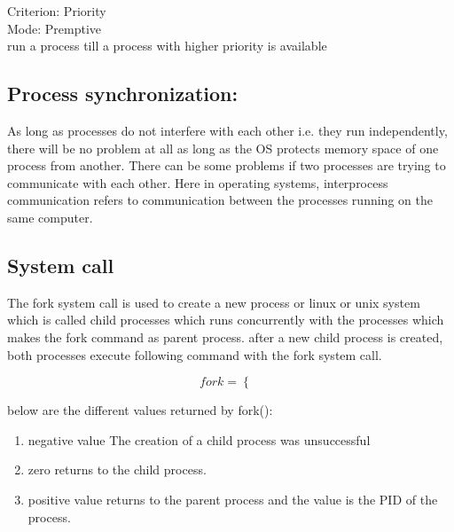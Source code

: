 \documentclass[12pt,letterpaper]{article}
\begin{document}
  Criterion: Priority\\ 
  Mode: Premptive\\ 
  
  run a process till a process with higher priority is available

  \subsection{Process synchronization:}
  As long as processes do not interfere with each other i.e. they run independently, 
  there will be no problem at all as long as the OS protects memory space of one process
  from another. There can be some problems if two processes are trying to communicate 
  with each other. Here in operating systems, interprocess communication refers to 
  communication between the processes running on the same computer. 


  \subsection{System call}
  The fork system call is used to create a new process or linux or unix system which is 
  called child processes which runs concurrently with the processes which makes the 
  fork command as parent process. after a new child process is created, both processes 
  execute following command with the fork system call. 

  \[
    fork = \begin{cases} \end{cases}
  \]

  below are the different values returned by fork(): 
  \begin{enumerate}
    \item negative value
      The creation of a child process was unsuccessful
    \item zero
      returns to the child process. 
    \item positive value
      returns to the parent process and the value is the PID of the process. 
  \end{enumerate}
\end{document}
